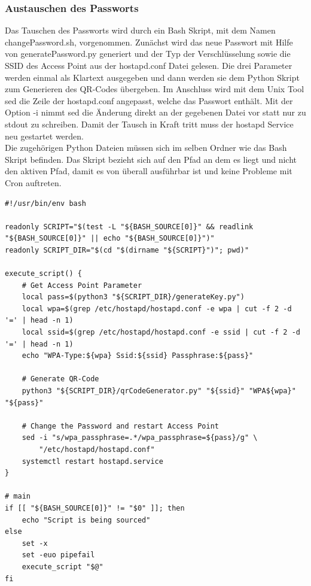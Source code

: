 \documentclass[a4paper,11pt,singlespacing]{article}
\begin{document}
    	    

    	
    	\subsubsection{Austauschen des Passworts}
    		Das Tauschen des Passworts wird durch ein Bash Skript, mit dem Namen changePassword.sh, vorgenommen. Zunächst wird das neue Passwort mit Hilfe von generatePassword.py generiert und der Typ der Verschlüsselung sowie die SSID des Access Point aus der hostapd.conf Datei gelesen. Die drei Parameter werden einmal als Klartext ausgegeben und dann werden sie dem Python Skript zum Generieren des QR-Codes übergeben. Im Anschluss wird mit dem Unix Tool sed die Zeile der hostapd.conf angepasst, welche das Passwort enthält. Mit der Option -i nimmt sed die Änderung direkt an der gegebenen Datei vor statt nur zu stdout zu schreiben. Damit der Tausch in Kraft tritt muss der hostapd Service neu gestartet werden. \\ 
    		Die zugehörigen Python Dateien müssen sich im selben Ordner wie das Bash Skript befinden. Das Skript bezieht sich auf den Pfad an dem es liegt und nicht den aktiven Pfad, damit es von überall ausführbar ist und keine Probleme mit Cron auftreten.  \\
    	\begin{lstlisting}
#!/usr/bin/env bash

readonly SCRIPT="$(test -L "${BASH_SOURCE[0]}" && readlink "${BASH_SOURCE[0]}" || echo "${BASH_SOURCE[0]}")"
readonly SCRIPT_DIR="$(cd "$(dirname "${SCRIPT}")"; pwd)"

execute_script() {
	# Get Access Point Parameter
	local pass=$(python3 "${SCRIPT_DIR}/generateKey.py")         
	local wpa=$(grep /etc/hostapd/hostapd.conf -e wpa | cut -f 2 -d '=' | head -n 1)
	local ssid=$(grep /etc/hostapd/hostapd.conf -e ssid | cut -f 2 -d '=' | head -n 1)
	echo "WPA-Type:${wpa} Ssid:${ssid} Passphrase:${pass}" 

	# Generate QR-Code
	python3 "${SCRIPT_DIR}/qrCodeGenerator.py" "${ssid}" "WPA${wpa}" "${pass}"

	# Change the Password and restart Access Point
	sed -i "s/wpa_passphrase=.*/wpa_passphrase=${pass}/g" \
		"/etc/hostapd/hostapd.conf"
	systemctl restart hostapd.service
}

# main
if [[ "${BASH_SOURCE[0]}" != "$0" ]]; then
	echo "Script is being sourced"
else
	set -x
	set -euo pipefail
	execute_script "$@"
fi  	
    	\end{lstlisting}
\end{document}
